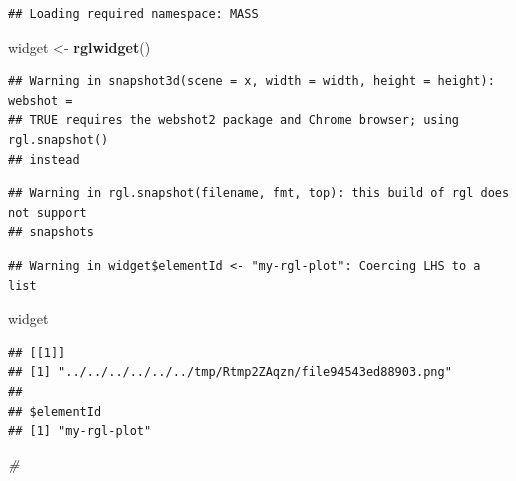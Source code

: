 \documentclass[
]{article}
\newenvironment{Shaded}{\begin{snugshade}}{\end{snugshade}}
\newcommand{\CommentTok}[1]{\textcolor[rgb]{0.56,0.35,0.01}{\textit{#1}}}
\newcommand{\FunctionTok}[1]{\textcolor[rgb]{0.13,0.29,0.53}{\textbf{#1}}}
\newcommand{\NormalTok}[1]{#1}
\newcommand{\OtherTok}[1]{\textcolor[rgb]{0.56,0.35,0.01}{#1}}
\newcommand{\SpecialCharTok}[1]{\textcolor[rgb]{0.81,0.36,0.00}{\textbf{#1}}}
\newcommand{\StringTok}[1]{\textcolor[rgb]{0.31,0.60,0.02}{#1}}
\begin{document}
\begin{verbatim}
## Loading required namespace: MASS
\end{verbatim}

\begin{Shaded}
\begin{Highlighting}[]
\NormalTok{widget }\OtherTok{\textless{}{-}} \FunctionTok{rglwidget}\NormalTok{()}
\end{Highlighting}
\end{Shaded}

\begin{verbatim}
## Warning in snapshot3d(scene = x, width = width, height = height): webshot =
## TRUE requires the webshot2 package and Chrome browser; using rgl.snapshot()
## instead
\end{verbatim}

\begin{verbatim}
## Warning in rgl.snapshot(filename, fmt, top): this build of rgl does not support
## snapshots
\end{verbatim}

\begin{Shaded}
\end{Shaded}

\begin{verbatim}
## Warning in widget$elementId <- "my-rgl-plot": Coercing LHS to a list
\end{verbatim}

\begin{Shaded}
\begin{Highlighting}[]
\NormalTok{widget}
\end{Highlighting}
\end{Shaded}

\begin{verbatim}
## [[1]]
## [1] "../../../../../../tmp/Rtmp2ZAqzn/file94543ed88903.png"
## 
## $elementId
## [1] "my-rgl-plot"
\end{verbatim}

\begin{Shaded}
\begin{Highlighting}[]
\CommentTok{\#}
\end{Highlighting}
\end{Shaded}
\end{document}
